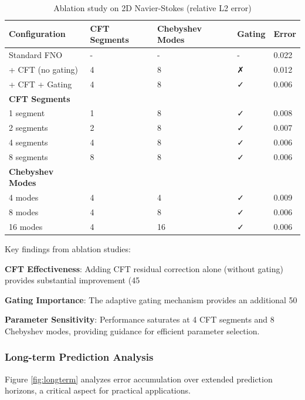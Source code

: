 \documentclass[11pt]{article}
\begin{document}
\begin{table}[h]
\centering
\caption{Ablation study on 2D Navier-Stokes (relative L2 error)}
\label{tab:ablation}
\small
\begin{tabular}{@{}p{3cm}p{1.5cm}p{1.5cm}p{1.5cm}p{1.5cm}@{}}
\toprule
\textbf{Configuration} & \textbf{CFT Segments} & \textbf{Chebyshev Modes} & \textbf{Gating} & \textbf{Error} \\
\midrule
Standard FNO & - & - & - & 0.022 \\
+ CFT (no gating) & 4 & 8 & ✗ & 0.012 \\
+ CFT + Gating & 4 & 8 & ✓ & 0.006 \\
\midrule
\textbf{CFT Segments} & & & & \\
1 segment & 1 & 8 & ✓ & 0.008 \\
2 segments & 2 & 8 & ✓ & 0.007 \\
4 segments & 4 & 8 & ✓ & 0.006 \\
8 segments & 8 & 8 & ✓ & 0.006 \\
\midrule
\textbf{Chebyshev Modes} & & & & \\
4 modes & 4 & 4 & ✓ & 0.009 \\
8 modes & 4 & 8 & ✓ & 0.006 \\
16 modes & 4 & 16 & ✓ & 0.006 \\
\bottomrule
\end{tabular}
\end{table}

Key findings from ablation studies:

\textbf{CFT Effectiveness}: Adding CFT residual correction alone (without gating) provides substantial improvement (45%

\textbf{Gating Importance}: The adaptive gating mechanism provides an additional 50%

\textbf{Parameter Sensitivity}: Performance saturates at 4 CFT segments and 8 Chebyshev modes, providing guidance for efficient parameter selection.

\subsubsection{Long-term Prediction Analysis}

Figure \ref{fig:longterm} analyzes error accumulation over extended prediction horizons, a critical aspect for practical applications.
\end{document}
